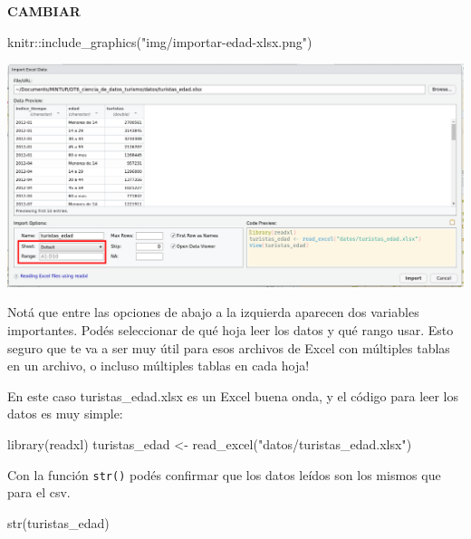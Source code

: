 \documentclass[
  openany]{book}
\newenvironment{Shaded}{\begin{snugshade}}{\end{snugshade}}
\newcommand{\FunctionTok}[1]{\textcolor[rgb]{0.00,0.00,0.00}{#1}}
\newcommand{\NormalTok}[1]{#1}
\newcommand{\OtherTok}[1]{\textcolor[rgb]{0.56,0.35,0.01}{#1}}
\newcommand{\SpecialCharTok}[1]{\textcolor[rgb]{0.00,0.00,0.00}{#1}}
\newcommand{\StringTok}[1]{\textcolor[rgb]{0.31,0.60,0.02}{#1}}
\begin{document}
\textbf{CAMBIAR}

\begin{Shaded}
\begin{Highlighting}[]
\NormalTok{knitr}\SpecialCharTok{::}\FunctionTok{include\_graphics}\NormalTok{(}\StringTok{"img/importar{-}edad{-}xlsx.png"}\NormalTok{)}
\end{Highlighting}
\end{Shaded}

\begin{center}\includegraphics[width=1\linewidth]{img/importar-edad-xlsx} \end{center}

Notá que entre las opciones de abajo a la izquierda aparecen dos variables importantes.
Podés seleccionar de qué hoja leer los datos y qué rango usar.
Esto seguro que te va a ser muy útil para esos archivos de Excel con múltiples tablas en un archivo, o incluso múltiples tablas en cada hoja!

En este caso turistas\_edad.xlsx es un Excel buena onda, y el código para leer los datos es muy simple:

\begin{Shaded}
\begin{Highlighting}[]
\FunctionTok{library}\NormalTok{(readxl)}
\NormalTok{turistas\_edad }\OtherTok{\textless{}{-}} \FunctionTok{read\_excel}\NormalTok{(}\StringTok{"datos/turistas\_edad.xlsx"}\NormalTok{)}
\end{Highlighting}
\end{Shaded}

Con la función \texttt{str()} podés confirmar que los datos leídos son los mismos que para el csv.

\begin{Shaded}
\begin{Highlighting}[]
\FunctionTok{str}\NormalTok{(turistas\_edad)}
\end{Highlighting}
\end{Shaded}
\end{document}
